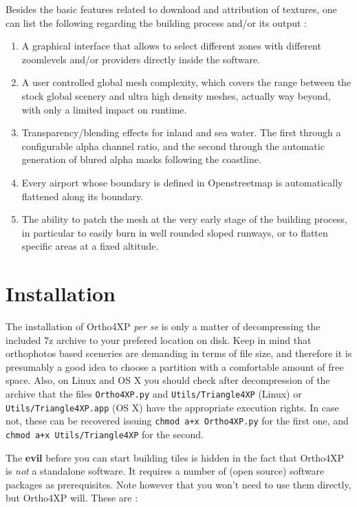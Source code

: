 \documentclass[12pt]{article}
\begin{document}
Besides the basic features related to download and attribution of textures, one can list the following regarding the building process and/or its output :
\begin{enumerate}
  \item A graphical interface that allows to select different zones with different zoomlevels and/or providers directly inside the software.
  \item A user controlled global mesh complexity, which covers the range between the stock global scenery and ultra high density meshes, actually way beyond, with only a limited impact on runtime.
  \item Transparency/blending effects for inland and sea water. The first through a configurable alpha channel ratio, and the second through the automatic generation of blured alpha masks following the coastline.
  \item Every airport whose boundary is defined in Openstreetmap is automatically flattened along its boundary.
  \item The ability to patch the mesh at the very early stage of the building process, in particular to easily burn in well rounded sloped runways, or to flatten specific areas at a fixed altitude.
\end{enumerate}


\section{Installation}

The installation of Ortho4XP {\it per se} is only a matter of decompressing the included 7z archive to your prefered location on disk.
Keep in mind that orthophotos based sceneries are demanding in terms of file size, and therefore it is presumably a good idea to choose a partition with a comfortable amount of free space.
Also, on Linux and OS X you should check after decompression of the archive that the files {\tt Ortho4XP.py} and {\tt Utils/Triangle4XP} (Linux) or {\tt Utils/Triangle4XP.app} (OS X) have the appropriate execution rights. In case not, these can be recovered issuing {\tt chmod a+x Ortho4XP.py} for the first one, and {\tt chmod a+x Utils/Triangle4XP} for the second.

\medskip

The {\bf evil} before you can start building tiles is hidden in the fact that Ortho4XP is {\it not} a standalone software. It requires a number of (open source) software packages as prerequisites. Note however that you won't need to use them directly, but Ortho4XP will.
These are :
\end{document}
